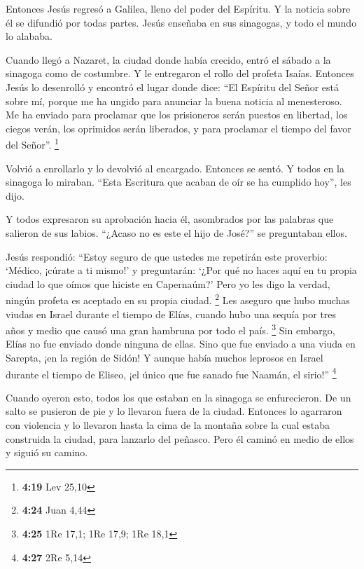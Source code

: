  Entonces Jesús regresó a Galilea, lleno del poder del
Espíritu. Y la noticia sobre él se difundió por todas partes.
 Jesús enseñaba en sus sinagogas, y todo el mundo lo
alababa.

 Cuando llegó a Nazaret, la ciudad donde había crecido,
entró el sábado a la sinagoga como de costumbre.  Y le
entregaron el rollo del profeta Isaías. Entonces Jesús lo desenrolló y
encontró el lugar donde dice:  ``El Espíritu del Señor
está sobre mí, porque me ha ungido para anunciar la buena noticia al
menesteroso. Me ha enviado para proclamar que los prisioneros serán
puestos en libertad, los ciegos verán, los oprimidos serán liberados,
 y para proclamar el tiempo del favor del Señor''.
\footnote{\textbf{4:19} Lev 25,10}

 Volvió a enrollarlo y lo devolvió al encargado. Entonces
se sentó. Y todos en la sinagoga lo miraban.  ``Esta
Escritura que acaban de oír se ha cumplido hoy'', les dijo.

 Y todos expresaron su aprobación hacia él, asombrados
por las palabras que salieron de sus labios. ``¿Acaso no es este el hijo
de José?'' se preguntaban ellos.

 Jesús respondió: ``Estoy seguro de que ustedes me
repetirán este proverbio: `Médico, ¡cúrate a ti mismo!' y preguntarán:
`¿Por qué no haces aquí en tu propia ciudad lo que oímos que hiciste en
Capernaúm?'  Pero yo les digo la verdad, ningún profeta
es aceptado en su propia ciudad. \footnote{\textbf{4:24} Juan 4,44}
 Les aseguro que hubo muchas viudas en Israel durante el
tiempo de Elías, cuando hubo una sequía por tres años y medio que causó
una gran hambruna por todo el país. \footnote{\textbf{4:25} 1Re 17,1;
  1Re 17,9; 1Re 18,1}  Sin embargo, Elías no fue enviado
donde ninguna de ellas. Sino que fue enviado a una viuda en Sarepta, ¡en
la región de Sidón!  Y aunque había muchos leprosos en
Israel durante el tiempo de Eliseo, ¡el único que fue sanado fue Naamán,
el sirio!'' \footnote{\textbf{4:27} 2Re 5,14}

 Cuando oyeron esto, todos los que estaban en la sinagoga
se enfurecieron.  De un salto se pusieron de pie y lo
llevaron fuera de la ciudad. Entonces lo agarraron con violencia y lo
llevaron hasta la cima de la montaña sobre la cual estaba construida la
ciudad, para lanzarlo del peñasco.  Pero él caminó en
medio de ellos y siguió su camino.

